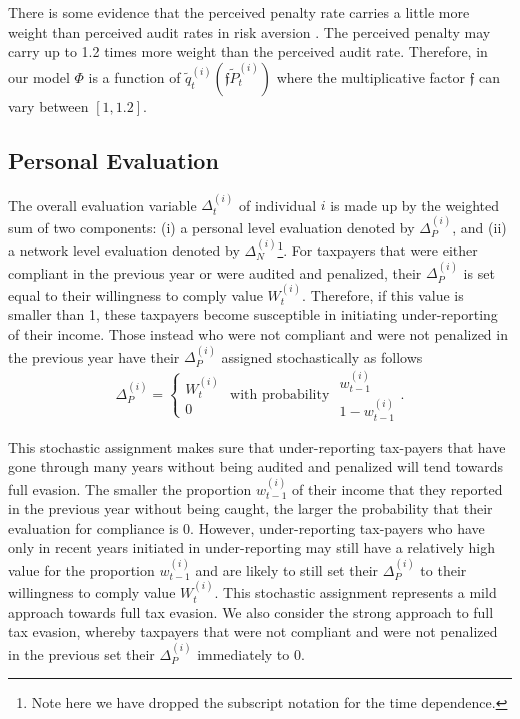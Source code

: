 \documentclass{NSF_proposal_mod}
\begin{document}
There is some evidence that the perceived penalty rate carries a little more weight than perceived audit rates in risk aversion \cite{Friedland1978}. The perceived penalty may carry up to 1.2 times more weight than the perceived audit rate. Therefore, in our model $\Phi$ is a function of $\tilde{q}^{(i)}_t({\mathfrak f} \tilde{P}^{(i)}_t)$  where the multiplicative factor ${\mathfrak f} $ can vary between $[1,1.2]$. 

\subsection{Personal Evaluation}
\label{Sec:Pers_Eval}

The overall evaluation variable $\Delta^{(i)}_t$ of individual $i$ is made up by the weighted sum of two components: (i) a personal level evaluation denoted by $\Delta^{(i)}_P$, and (ii)  a network level evaluation denoted by $\Delta^{(i)}_N$\footnote{Note here we have dropped the subscript notation for the time dependence.}. For taxpayers that were either compliant in the previous year or were audited and penalized, their $\Delta_P^{(i)}$  is set equal to their willingness to comply value $W^{(i)}_t$. Therefore, if this value is smaller than 1,  these taxpayers become susceptible in initiating under-reporting of their income. Those instead who were not compliant and were not penalized in the previous year have their $\Delta_P^{(i)}$ assigned stochastically as follows
\begin{equation}
\Delta_P^{(i)}= \left\{ 
\begin{array}{c}
W^{(i)}_t \\
 0 
\end{array} \right .\mbox{ with probability }
\begin{array}{c}
w^{(i)}_{t-1}\\
1-w^{(i)}_{t-1}
\end{array}.
\label{eq:DeltaP}
\end{equation}


This stochastic assignment makes sure that under-reporting tax-payers that have gone through many years without being audited and penalized will tend towards full evasion. The smaller the proportion $w^{(i)}_{t-1}$ of their income that they reported in the previous year without being caught, the larger the probability that their evaluation for compliance is 0.  However, under-reporting tax-payers who have only in recent years initiated in under-reporting may still have a relatively high value for the proportion $w^{(i)}_{t-1}$ and are likely to still set  their $\Delta_P^{(i)}$  to their willingness to comply value $W^{(i)}_t$. This stochastic assignment represents a mild approach towards full tax evasion. We also consider the strong approach to full tax evasion, whereby  taxpayers that were not compliant and were not penalized in the previous set their $\Delta_P^{(i)}$ immediately to 0. 
\end{document}
